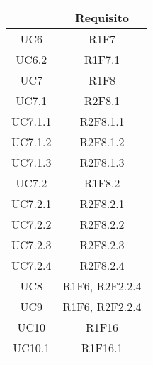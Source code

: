 \begin{table}[H]
	\centering
	\renewcommand{\arraystretch}{1.8}
	\begin{tabular}{c | c}
		\rowcolor[HTML]{125E28}
		\multicolumn{1}{c}{\color[HTML]{FFFFFF} \textbf{Fonte}} &
		\multicolumn{1}{c}{\color[HTML]{FFFFFF} \textbf{Requisito}}                                \\
		\hline
		UC6                                                     & R1F7                             \\ \hline
		UC6.2                                                   & R1F7.1                           \\ \hline
		UC7                                                     & R1F8                             \\ \hline
		UC7.1                                                   & R2F8.1                           \\ \hline
		UC7.1.1                                                 & R2F8.1.1                         \\ \hline
		UC7.1.2                                                 & R2F8.1.2                         \\ \hline
		UC7.1.3                                                 & R2F8.1.3                         \\ \hline
		UC7.2                                                   & R1F8.2                           \\ \hline
		UC7.2.1                                                 & R2F8.2.1                         \\ \hline
		UC7.2.2                                                 & R2F8.2.2                         \\ \hline
		UC7.2.3                                                 & R2F8.2.3                         \\ \hline
		UC7.2.4                                                 & R2F8.2.4                         \\ \hline
		UC8                                                     & R1F6, R2F2.2.4                   \\ \hline
		UC9                                                     & R1F6, R2F2.2.4                   \\ \hline
		UC10                                                    & R1F16                            \\ \hline
		UC10.1                                                  & R1F16.1                          \\ \hline

\end{tabular}
\end{table}

